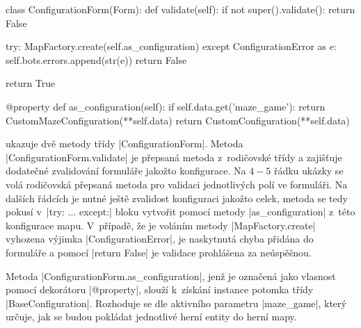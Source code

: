 \begin{code}[caption={Implementace vlastních metod v~$ConfigurationForm$},label={lst:conf-form-methods}]
class ConfigurationForm(Form):
    def validate(self):
        if not super().validate():
            return False

        try:
            MapFactory.create(self.as_configuration)
        except ConfigurationError as e:
            self.bots.errors.append(str(e))
            return False

        return True

    @property
    def as_configuration(self):
        if self.data.get('maze_game'):
            return CustomMazeConfiguration(**self.data)
        return CustomConfiguration(**self.data)
\end{code}

 ukazuje dvě metody třídy \ic|ConfigurationForm|. Metoda \ic|ConfigurationForm.validate| je přepsaná metoda z~rodičovské třídy a zajišťuje dodatečné zvalidování formuláře jakožto konfigurace. Na $4-5$ řádku ukázky se volá rodičovská přepsaná metoda pro validaci jednotlivých polí ve formuláři. Na dalších řádcích je nutné ještě zvalidost konfiguraci jakožto celek, metoda se tedy pokusí v~\ic|try: ... except:| bloku vytvořit pomocí metody \ic|as_configuration| z~této konfigurace mapu. V~případě, že je voláním metody \ic|MapFactory.create| vyhozena výjimka \ic|ConfigurationError|, je naskytnutá chyba přidána do formuláře a pomocí \ic|return False| je validace prohlášena za neúspěšnou. 

\begin{sloppypar}
    Metoda \ic|ConfigurationForm.as_configuration|, jenž je označená jako vlasnost pomocí dekorátoru \ic|@property|, slouží k~získání instance potomka třídy \ic|BaseConfiguration|. Rozhoduje se dle aktivního parametru \ic|maze_game|, který určuje, jak se budou pokládat jednotlivé herní entity do herní mapy.
\end{sloppypar}